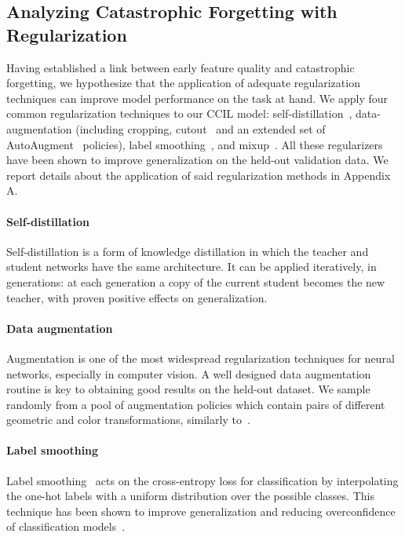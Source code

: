 \documentclass[final]{cvpr}
\begin{document}
\subsection{Analyzing Catastrophic Forgetting with Regularization}
\label{sec:regularization}
Having established a link between early feature quality and catastrophic forgetting, we hypothesize that the application of adequate regularization techniques can improve model performance on the task at hand. We apply four common regularization techniques to our CCIL model: self-distillation~\cite{bornagain_nn}, data-augmentation (including cropping, cutout~\cite{cutout} and an extended set of AutoAugment~\cite{Cubuk_2019_CVPR} policies), label smoothing~\cite{label_smoothing}, and mixup~\cite{mixup}. All these regularizers have been shown to improve generalization on the held-out validation data. We report details about the application of said regularization methods in Appendix A.

\paragraph{Self-distillation}
Self-distillation \cite{bornagain_nn, sd_hilbert} is a form of knowledge distillation in which the teacher and student networks have the same architecture. It can be applied iteratively, in generations: at each generation a copy of the current student becomes the new teacher, with proven positive effects on generalization.


\paragraph{Data augmentation}
Augmentation is one of the most widespread regularization techniques for neural networks, especially in computer vision. A well designed data augmentation routine is key to obtaining good results on the held-out dataset. We sample randomly from a pool of augmentation policies which contain pairs of different geometric and color transformations, similarly to~\cite{Cubuk_2019_CVPR}.

\paragraph{Label smoothing}
Label smoothing~\cite{label_smoothing} acts on the cross-entropy loss for classification by interpolating the one-hot labels with a uniform distribution over the possible classes. This technique has been shown to improve generalization and reducing overconfidence of classification models~\cite{label_smoothing}. 
\end{document}
